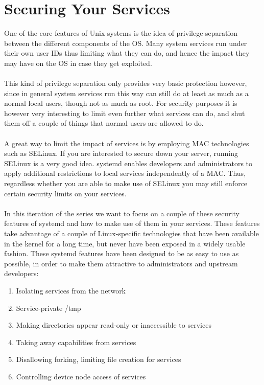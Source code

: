 \documentclass[titlepage]{article}
\begin{document}
\section{Securing Your Services}
One of the core features of Unix systems is the idea of privilege separation between the different components of the OS. Many system services run under their own user IDs thus limiting what they can do, and hence the impact they may have on the OS in case they get exploited.
\\
\\
This kind of privilege separation only provides very basic protection however, since in general system services run this way can still do at least as much as a normal local users, though not as much as root. For security purposes it is however very interesting to limit even further what services can do, and shut them off a couple of things that normal users are allowed to do.
\\
\\
A great way to limit the impact of services is by employing MAC technologies such as SELinux. If you are interested to secure down your server, running SELinux is a very good idea. systemd enables developers and administrators to apply additional restrictions to local services independently of a MAC. Thus, regardless whether you are able to make use of SELinux you may still enforce certain security limits on your services.
\\
\\
In this iteration of the series we want to focus on a couple of these security features of systemd and how to make use of them in your services. These features take advantage of a couple of Linux-specific technologies that have been available in the kernel for a long time, but never have been exposed in a widely usable fashion. These systemd features have been designed to be as easy to use as possible, in order to make them attractive to administrators and upstream developers:
\begin{enumerate}
\item Isolating services from the network
\item Service-private /tmp
\item Making directories appear read-only or inaccessible to services
\item Taking away capabilities from services
\item Disallowing forking, limiting file creation for services
\item Controlling device node access of services
\end{enumerate}
\end{document}
